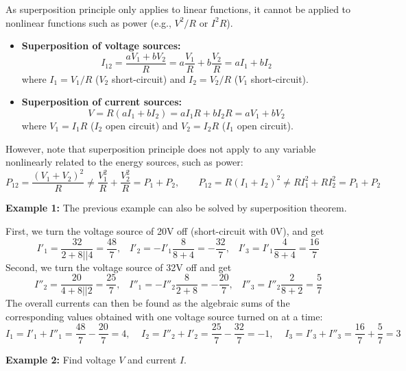 \begin{itemize}
As superposition principle only applies to linear functions, it cannot be
applied to nonlinear functions such as power (e.g., $V^2/R$ or $I^2R$). 


\begin{itemize}
\item {\bf Superposition of voltage sources:}
  \[	I_{12}=\frac{aV_1+bV_2}{R}=a\frac{V_1}{R}+b\frac{V_2}{R}=aI_1+bI_2 \]
  where $I_1=V_1/R$ ($V_2$ short-circuit) and $I_2=V_2/R$ ($V_1$ short-circuit).

\item {\bf Superposition of current sources:}
  \[	V=R(aI_1+bI_2)=aI_1R+bI_2R=aV_1+bV_2 \]
  where $V_1=I_1R$ ($I_2$ open circuit) and $V_2=I_2R$ ($I_1$ open circuit).
\end{itemize}

However, note that superposition principle does not apply to any variable
nonlinearly related to the energy sources, such as power:
\[
P_{12}=\frac{(V_1+V_2)^2}{R}\ne\frac{V_1^2}{R}+\frac{V_2^2}{R}=P_1+P_2,
\;\;\;\;\;\;\;
P_{12}=R(I_1+I_2)^2 \ne RI_1^2+RI_2^2=P_1+P_2	
\]

{\bf Example 1:} The previous example can also be solved by superposition 
theorem. 


First, we turn the voltage source of 20V off (short-circuit with 0V), and get
\[ I'_1=\frac{32}{2+8 || 4}=\frac{48}{7},\;\;\;I'_2=-I'_1\frac{8}{8+4}=-\frac{32}{7},
   \;\;\;I'_3=I'_1\frac{4}{8+4}=\frac{16}{7} \]
Second, we turn the voltage source of 32V off and get
\[ I''_2=\frac{20}{4+8 || 2}=\frac{25}{7},\;\;\;I''_1=-I''_2\frac{8}{2+8}=-\frac{20}{7},
   \;\;\;I''_3=I''_2\frac{2}{8+2}=\frac{5}{7} \]
The overall currents can then be found as the algebraic sums of the
corresponding values obtained with one voltage source turned on at a time:
\[ I_1=I'_1+I''_1=\frac{48}{7}-\frac{20}{7}=4,\;\;\;\;
   I_2=I''_2+I'_2=\frac{25}{7}-\frac{32}{7}=-1,\;\;\;\;
   I_3=I'_3+I''_3=\frac{16}{7}+\frac{5}{7}=3 \]

{\bf Example 2:} Find voltage $V$ and current $I$.



\end{itemize}
